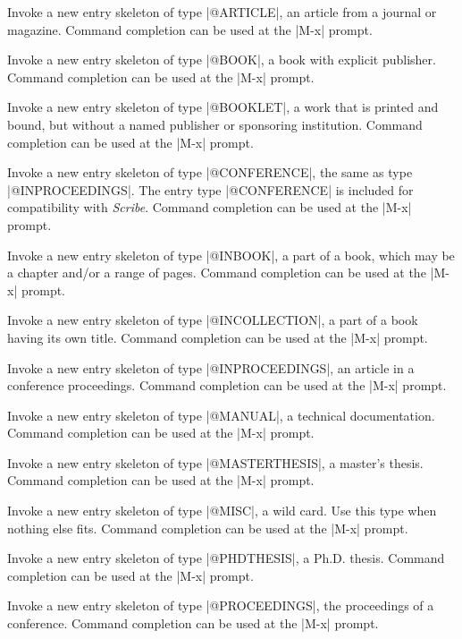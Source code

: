 Invoke a new entry skeleton of type |@ARTICLE|,
an article from a journal or magazine.
Command completion can be used at the |M-x| prompt.

Invoke a new entry skeleton of type |@BOOK|,
a book with explicit publisher.
Command completion can be used at the |M-x| prompt.

Invoke a new entry skeleton of type |@BOOKLET|,
a work that is printed and bound, but without a named publisher or
sponsoring institution.
Command completion can be used at the |M-x| prompt.

Invoke a new entry skeleton of type |@CONFERENCE|,
the same as type |@INPROCEEDINGS|.
The entry type |@CONFERENCE| is included for compatibility with {\it Scribe\/}.
Command completion can be used at the |M-x| prompt.
 
Invoke a new entry skeleton of type |@INBOOK|,
a part of a book, which may be a chapter and/or a range of pages.
Command completion can be used at the |M-x| prompt.

Invoke a new entry skeleton of type |@INCOLLECTION|,
a part of a book having its own title.
Command completion can be used at the |M-x| prompt.

Invoke a new entry skeleton of type |@INPROCEEDINGS|,
an article in a conference proceedings.
Command completion can be used at the |M-x| prompt.

Invoke a new entry skeleton of type |@MANUAL|,
a technical documentation.
Command completion can be used at the |M-x| prompt.

Invoke a new entry skeleton of type |@MASTERTHESIS|,
a master's thesis.
Command completion can be used at the |M-x| prompt.

Invoke a new entry skeleton of type |@MISC|,
a wild card.  Use this type when nothing else fits.
Command completion can be used at the |M-x| prompt.

Invoke a new entry skeleton of type |@PHDTHESIS|,
a Ph.D. thesis.
Command completion can be used at the |M-x| prompt.

Invoke a new entry skeleton of type |@PROCEEDINGS|,
the proceedings of a conference.
Command completion can be used at the |M-x| prompt.

